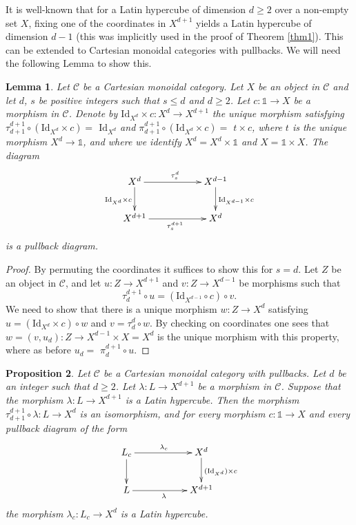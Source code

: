\documentclass{amsart} %
\theoremstyle{plain}\newtheorem{Theorem}{Theorem}[section]
\theoremstyle{plain}\newtheorem{Conjecture}[Theorem]{Conjecture}
\theoremstyle{plain}\newtheorem{Corollary}[Theorem]{Corollary}
\theoremstyle{plain}\newtheorem{Lemma}[Theorem]{Lemma}
\theoremstyle{plain}\newtheorem{Proposition}[Theorem]{Proposition}
\theoremstyle{definition}\newtheorem{Definition}[Theorem]{Definition}
\theoremstyle{definition}\newtheorem{Example}[Theorem]{Example}
\theoremstyle{definition}\newtheorem{Examples}[Theorem]{Examples}
\theoremstyle{definition}\newtheorem{Remark}[Theorem]{Remark}
\theoremstyle{definition}\newtheorem{Remarks}[Theorem]{Remarks}
\theoremstyle{plain}\newtheorem{Statement}[Theorem]{}
\def\CC{{\mathcal{C}}}    \def\OP{{\mathcal{O}P}}
\def\One{{\mathds{1}}}
\def\Id{\mathrm{Id}}             \def\tenA{\otimes_A}
\begin{document}
 It is well-known that for a  Latin hypercube of dimension $d\geq 2$ 
over a non-empty set $X$, fixing one of the coordinates in $X^{d+1}$ yields
a Latin hypercube of dimension $d-1$ (this was implicitly used in the proof of
Theorem \ref{thm1}). This can be  extended to Cartesian monoidal categories
with pullbacks. We will need the following Lemma to show this.

\begin{Lemma} \label{monoidalLemma1}
Let $\CC$ be a Cartesian monoidal category. Let $X$ be an object in $\CC$ and
let $d$, $s$  be  positive integers such that $s\leq d$ and $d\geq 2$. 
Let $c :\One\to X$ be
a morphism in $\CC$. Denote by $\Id_{X^d}\times c : X^d\to X^{d+1}$ the 
unique morphism satisfying $\tau^{d+1}_{d+1} \circ (\Id_{X^d}\times c) =$ $\Id_{X^d}$
and $\pi^{d+1}_{d+1} \circ (\Id_{X^d}\times c) =$ $t\times c$, where $t$ is the
unique morphism $X^d\to\One$, and where we identify $X^d=X^d\times\One$ and
$X=\One\times X$.
The diagram
$$\xymatrix{ X^d \ar[rr]^{\tau^d_s} \ar[d]_{\Id_{X^d}\times c} & & 
X^{d-1} \ar[d]^{\Id_{X^{d-1}}\times c} \\
X^{d+1} \ar[rr]_{\tau^{d+1}_s} & & X^d} $$
is a pullback  diagram.
\end{Lemma}

\begin{proof} 
By permuting the coordinates it suffices to show this for $s=d$. 
Let $Z$ be an object in $\CC$, and let $u : Z\to X^{d+1}$ and
$v : Z\to X^{d-1}$ be morphisms such that 
$$\tau^{d+1}_d\circ u= (\Id_{X^{d-1}}\circ c)\circ v.$$
We need to show that there is a unique morphism $w : Z\to X^d$ satisfying
$u=(\Id_{X^d}\times c)\circ w$ and $v = \tau^d_d\circ w$. By checking on
coordinates one sees that $w = (v,u_d) : Z\to X^{d-1}\times X=X^d$ is
the unique morphism with this property, where as before 
$u_d=$ $\pi^{d+1}_d\circ u$.
\end{proof}



\begin{Proposition} \label{monoidalProp2}
Let $\CC$ be a Cartesian monoidal category with  pullbacks.
Let $d$ be an integer such that $d\geq 2$.  Let $\lambda : L\to X^{d+1}$ be
a morphism in $\CC$. 
Suppose that the morphism $\lambda : L \to X^{d+1}$ is a Latin hypercube.
Then the morphism $\tau^{d+1}_{d+1}\circ\lambda : L\to X^d$ is an isomorphism, and
for every morphism $c : \One \to X$ and every pullback diagram of the form
$$\xymatrix{L_c \ar[rr]^{\lambda_c} \ar[d] & & X^d \ar[d]^{(\Id_{X^d})\times c}\\
L \ar[rr]_\lambda & & X^{d+1}}$$
the morphism $\lambda_c : L_c \to X^d$ is a Latin hypercube.
\end{Proposition} 
\end{document}
